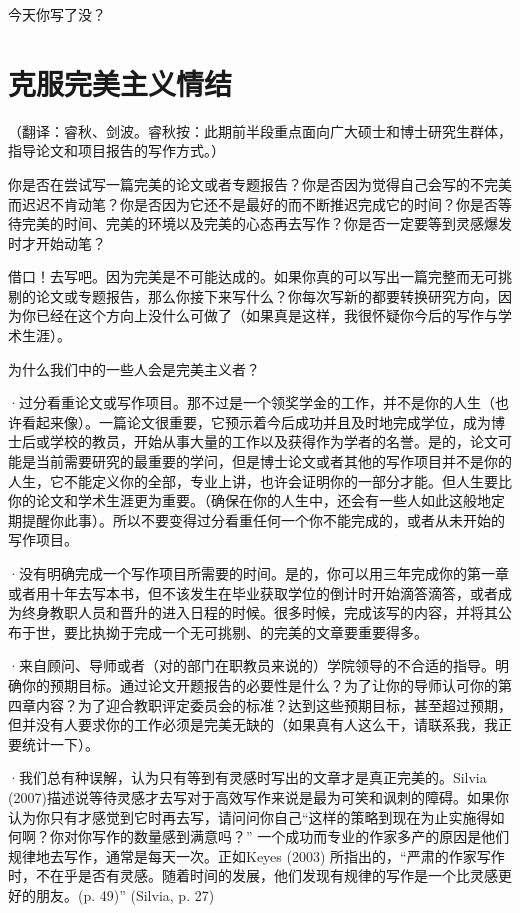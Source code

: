 \documentclass{ctexart}
\begin{document}
今天你写了没？

\section{克服完美主义情结}
（翻译：睿秋、剑波。睿秋按：此期前半段重点面向广大硕士和博士研究生群体，指导论文和项目报告的写作方式。）

你是否在尝试写一篇完美的论文或者专题报告？你是否因为觉得自己会写的不完美而迟迟不肯动笔？你是否因为它还不是最好的而不断推迟完成它的时间？你是否等待完美的时间、完美的环境以及完美的心态再去写作？你是否一定要等到灵感爆发时才开始动笔？

借口！去写吧。因为完美是不可能达成的。如果你真的可以写出一篇完整而无可挑剔的论文或专题报告，那么你接下来写什么？你每次写新的都要转换研究方向，因为你已经在这个方向上没什么可做了（如果真是这样，我很怀疑你今后的写作与学术生涯）。

为什么我们中的一些人会是完美主义者？

·过分看重论文或写作项目。那不过是一个领奖学金的工作，并不是你的人生（也许看起来像）。一篇论文很重要，它预示着今后成功并且及时地完成学位，成为博士后或学校的教员，开始从事大量的工作以及获得作为学者的名誉。是的，论文可能是当前需要研究的最重要的学问，但是博士论文或者其他的写作项目并不是你的人生，它不能定义你的全部，专业上讲，也许会证明你的一部分才能。但人生要比你的论文和学术生涯更为重要。（确保在你的人生中，还会有一些人如此这般地定期提醒你此事）。所以不要变得过分看重任何一个你不能完成的，或者从未开始的写作项目。

·没有明确完成一个写作项目所需要的时间。是的，你可以用三年完成你的第一章或者用十年去写本书，但不该发生在毕业获取学位的倒计时开始滴答滴答，或者成为终身教职人员和晋升的进入日程的时候。很多时候，完成该写的内容，并将其公布于世，要比执拗于完成一个无可挑剔、的完美的文章要重要得多。

·来自顾问、导师或者（对的部门在职教员来说的）学院领导的不合适的指导。明确你的预期目标。通过论文开题报告的必要性是什么？为了让你的导师认可你的第四章内容？为了迎合教职评定委员会的标准？达到这些预期目标，甚至超过预期，但并没有人要求你的工作必须是完美无缺的（如果真有人这么干，请联系我，我正要统计一下）。

·我们总有种误解，认为只有等到有灵感时写出的文章才是真正完美的。Silvia (2007)描述说等待灵感才去写对于高效写作来说是最为可笑和讽刺的障碍。如果你认为你只有才感觉到它时再去写，请问问你自己“这样的策略到现在为止实施得如何啊？你对你写作的数量感到满意吗？” 一个成功而专业的作家多产的原因是他们规律地去写作，通常是每天一次。正如Keyes (2003) 所指出的，“严肃的作家写作时，不在乎是否有灵感。随着时间的发展，他们发现有规律的写作是一个比灵感更好的朋友。(p. 49)” (Silvia, p. 27)
\end{document}
